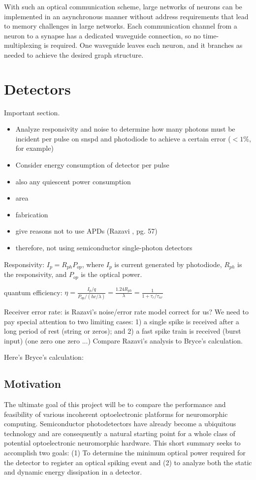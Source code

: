\documentclass[twocolumn]{article}
\begin{document}
With such an optical communication scheme, large networks of neurons can be implemented in an asynchronous manner without address requirements that lead to memory challenges in large networks. Each communication channel from a neuron to a synapse has a dedicated waveguide connection, so no time-multiplexing is required. One waveguide leaves each neuron, and it branches as needed to achieve the desired graph structure.

\section{\label{sec:detectors}Detectors}
Important section. 
\begin{itemize}
\item Analyze responsivity and noise to determine how many photons must be incident per pulse on snspd and photodiode to achieve a certain error ($<1\%$, for example)
\item Consider energy consumption of detector per pulse
\item also any quiescent power consumption
\item area
\item fabrication
\item give reasons not to use APDs (Razavi \cite{ra2012}, pg. 57)
\item therefore, not using semiconductor single-photon detectors
\end{itemize}

\vspace{2em}
\noindent Responsivity: $I_p = R_{ph}P_{op}$, where $I_p$ is current generated by photodiode, $R_{ph}$ is the responsivity, and $P_{op}$ is the optical power.

\vspace{2em}
\noindent quantum efficiency: $\eta = \frac{I_p/q}{P_{op}/(hc/\lambda)} = \frac{1.24R_{ph}}{\lambda} = \frac{1}{1+\tau_{r}/\tau_{nr}}$

\vspace{2em}
\noindent Receiver error rate: is Razavi's noise/error rate model correct for us? We need to pay special attention to two limiting cases: 1) a single spike is received after a long period of rest (string or zeros); and 2) a fast spike train is received (burst input) (one zero one zero ...) Compare Razavi's analysis to Bryce's calculation. 

Here's Bryce's calculation:

\subsection{Motivation}
The ultimate goal of this project will be to compare the performance and feasibility of various incoherent optoelectronic platforms for neuromorphic computing. Semiconductor photodetectors have already become a ubiquitous technology and are consequently a natural starting point for a whole class of potential optoelectronic neuromorphic hardware. This short summary seeks to accomplish two goals: (1) To determine the minimum optical power required for the detector to register an optical spiking event and (2) to analyze both the static and dynamic energy dissipation in a detector.
\end{document}
